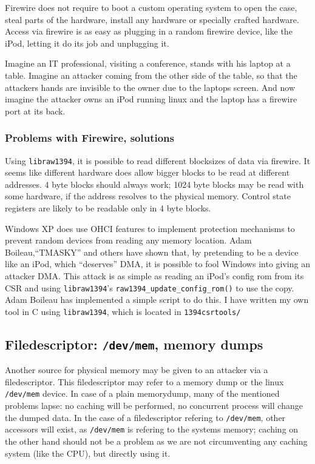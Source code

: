 Firewire does not require to boot a custom operating system to open the case,
steal parts of the hardware, install any hardware or specially crafted hardware.
Access via firewire is as easy as plugging in a random firewire device, like the
iPod, letting it do its job and unplugging it.

Imagine an IT professional, visiting a conference, stands with his laptop at a
table.  Imagine an attacker coming from the other side of the table, so that the
attackers hands are invisible to the owner due to the laptops screen. And now
imagine the attacker owns an iPod running linux and the laptop has a firewire
port at its back.



\subsubsection{Problems with Firewire, solutions}

Using \texttt{libraw1394}, it is possible to read different blocksizes of data
via firewire.  It seems like different hardware does allow bigger blocks to be
read at different addresses. 4 byte blocks should always work; 1024 byte blocks
may be read with some hardware, if the address resolves to the physical memory.
Control state registers are likely to be readable only in 4 byte blocks.

\label{windows-dma} Windows XP does use OHCI features to implement protection
mechanisms to prevent random devices from reading any memory location.  Adam
Boileau,``TMASKY'' and others have shown \cite{rux2k6firewire:2006} that, by
pretending to be a device like an iPod, which ``deserves'' DMA, it is possible
to fool Windows into giving an attacker DMA.  This attack is as simple as
reading an iPod's config rom from its CSR and using \texttt{libraw1394}'s
\texttt{raw1394\_update\_config\_rom()} to use the copy.  Adam Boileau has
implemented a simple script to do this. I have written my own tool in C using
\texttt{libraw1394}, which is located in \texttt{1394csrtools/}



\subsection{Filedescriptor: \texttt{/dev/mem}, memory dumps}

Another source for physical memory may be given to an attacker via a
filedescriptor. This filedescriptor may refer to a memory dump or the linux
\texttt{/dev/mem} device. In case of a plain memorydump, many of the mentioned
problems lapse: no caching will be performed, no concurrent process will change
the dumped data. In the case of a filedescriptor refering to \texttt{/dev/mem},
other accessors will exist, as \texttt{/dev/mem} is refering to the systems
memory; caching on the other hand should not be a problem as we are not
circumventing any caching system (like the CPU), but directly using it.

